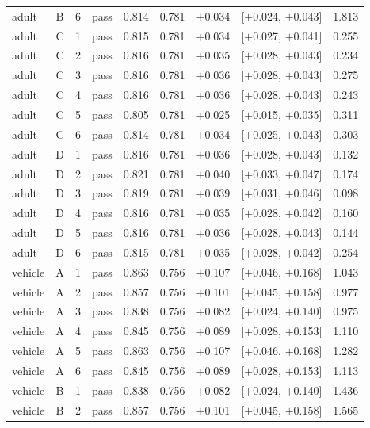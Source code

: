 {\begin{longtable}{lccl rrrcr}
adult & B & 6 & pass & 0.814 & 0.781 & $+$0.034 & [$+$0.024, $+$0.043] & 1.813 \\
\addlinespace[2pt]
adult & C & 1 & pass & 0.815 & 0.781 & $+$0.034 & [$+$0.027, $+$0.041] & 0.255 \\
adult & C & 2 & pass & 0.816 & 0.781 & $+$0.035 & [$+$0.028, $+$0.043] & 0.234 \\
adult & C & 3 & pass & 0.816 & 0.781 & $+$0.036 & [$+$0.028, $+$0.043] & 0.275 \\
adult & C & 4 & pass & 0.816 & 0.781 & $+$0.036 & [$+$0.028, $+$0.043] & 0.243 \\
adult & C & 5 & pass & 0.805 & 0.781 & $+$0.025 & [$+$0.015, $+$0.035] & 0.311 \\
adult & C & 6 & pass & 0.814 & 0.781 & $+$0.034 & [$+$0.025, $+$0.043] & 0.303 \\
\addlinespace[2pt]
adult & D & 1 & pass & 0.816 & 0.781 & $+$0.036 & [$+$0.028, $+$0.043] & 0.132 \\
adult & D & 2 & pass & 0.821 & 0.781 & $+$0.040 & [$+$0.033, $+$0.047] & 0.174 \\
adult & D & 3 & pass & 0.819 & 0.781 & $+$0.039 & [$+$0.031, $+$0.046] & 0.098 \\
adult & D & 4 & pass & 0.816 & 0.781 & $+$0.035 & [$+$0.028, $+$0.042] & 0.160 \\
adult & D & 5 & pass & 0.816 & 0.781 & $+$0.036 & [$+$0.028, $+$0.043] & 0.144 \\
adult & D & 6 & pass & 0.815 & 0.781 & $+$0.035 & [$+$0.028, $+$0.042] & 0.254 \\
\midrule
vehicle & A & 1 & pass & 0.863 & 0.756 & $+$0.107 & [$+$0.046, $+$0.168] & 1.043 \\
vehicle & A & 2 & pass & 0.857 & 0.756 & $+$0.101 & [$+$0.045, $+$0.158] & 0.977 \\
vehicle & A & 3 & pass & 0.838 & 0.756 & $+$0.082 & [$+$0.024, $+$0.140] & 0.975 \\
vehicle & A & 4 & pass & 0.845 & 0.756 & $+$0.089 & [$+$0.028, $+$0.153] & 1.110 \\
vehicle & A & 5 & pass & 0.863 & 0.756 & $+$0.107 & [$+$0.046, $+$0.168] & 1.282 \\
vehicle & A & 6 & pass & 0.845 & 0.756 & $+$0.089 & [$+$0.028, $+$0.153] & 1.113 \\
\addlinespace[2pt]
vehicle & B & 1 & pass & 0.838 & 0.756 & $+$0.082 & [$+$0.024, $+$0.140] & 1.436 \\
vehicle & B & 2 & pass & 0.857 & 0.756 & $+$0.101 & [$+$0.045, $+$0.158] & 1.565 \\

\end{longtable}}
